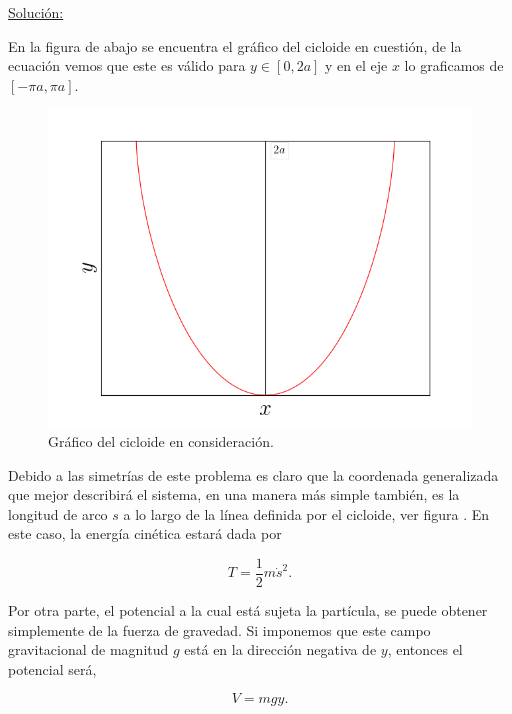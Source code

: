 \documentclass[a4paper,10pt]{article}
\numberwithin{equation}{section}
\begin{document}
\vspace{.3cm}

\underline{Solución:} \vspace{.3cm}

En la figura de abajo se encuentra el gráfico del cicloide en cuestión, de la ecuación 
vemos que este es válido para $y \in [0,2a]$ y en el eje $x$ lo graficamos de $[-\pi a, \pi a]$.

\begin{figure}[H]
 \center
 \includegraphics[scale=0.4]{problema5fig1}
 \caption{Gráfico del cicloide en consideración.}
 \label{fig:problema5fig1}
\end{figure}

Debido a las simetrías de este problema es claro que la coordenada generalizada que 
mejor describirá el sistema, en una manera más simple también, es la longitud de 
arco $s$ a lo largo de la línea definida por el cicloide, ver figura . 
En este caso, la energía cinética estará dada por 

\begin{equation}
 T = \frac{1}{2} m \dot{s}^2.
 \label{eq:energCinetCiclo1}
\end{equation}

Por otra parte, el potencial a la cual está sujeta la partícula, se puede obtener
simplemente de la fuerza de gravedad. Si imponemos que este campo gravitacional de 
magnitud $g$ está en la dirección negativa de $y$, entonces el potencial será,

\begin{equation}
 V = mgy.
 \label{eq:energPotenCiclo1}
\end{equation}
\end{document}
